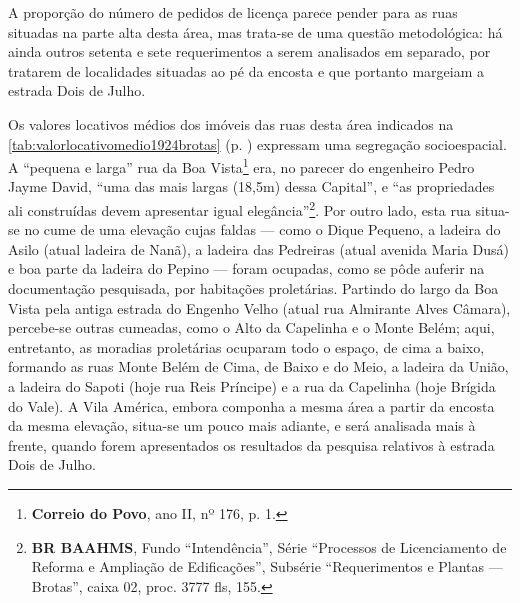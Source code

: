 
A proporção do número de pedidos de licença parece pender para as ruas situadas na parte alta desta área, mas trata-se de uma questão metodológica: há ainda outros setenta e sete requerimentos a serem analisados em separado, por tratarem de localidades situadas ao pé da encosta e que portanto margeiam a estrada Dois de Julho.


Os valores locativos médios dos imóveis das ruas desta área indicados na \autoref{tab:valorlocativomedio1924brotas} (p. \pageref{tab:valorlocativomedio1924brotas}) expressam uma segregação socioespacial. A ``pequena e larga'' rua da Boa Vista\footnote{\textbf{Correio do Povo}, ano II, nº 176, p. 1.} era, no parecer do engenheiro Pedro Jayme David, ``uma das mais largas (18,5m) dessa Capital'', e ``as propriedades ali construídas devem apresentar igual elegância''\footnote{\textbf{BR BAAHMS}, Fundo ``Intendência'', Série ``Processos de Licenciamento de Reforma e Ampliação de Edificações'', Subsérie ``Requerimentos e Plantas --- Brotas'', caixa 02, proc. 3777 fls, 155.}. Por outro lado, esta rua situa-se no cume de uma elevação cujas faldas --- como o Dique Pequeno, a ladeira do Asilo (atual ladeira de Nanã), a ladeira das Pedreiras (atual avenida Maria Dusá) e boa parte da ladeira do Pepino ---  foram ocupadas, como se pôde auferir na documentação pesquisada, por habitações proletárias. Partindo do largo da Boa Vista pela antiga estrada do Engenho Velho (atual rua Almirante Alves Câmara), percebe-se outras cumeadas, como o Alto da Capelinha e o Monte Belém; aqui, entretanto, as moradias proletárias ocuparam todo o espaço, de cima a baixo, formando as ruas Monte Belém de Cima, de Baixo e do Meio, a ladeira da União, a ladeira do Sapoti (hoje rua Reis Príncipe) e a rua da Capelinha (hoje Brígida do Vale). A Vila América, embora componha a mesma área a partir da encosta da mesma elevação, situa-se um pouco mais adiante, e será analisada mais à frente, quando forem apresentados os resultados da pesquisa relativos à estrada Dois de Julho. 

